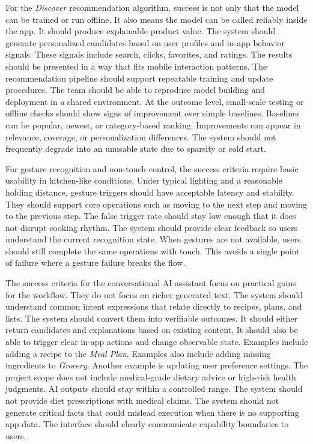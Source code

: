 \documentclass[journal]{IEEEtran}
\begin{document}
For the \textit{Discover} recommendation algorithm, success is not only that the model can be trained or run offline. It also means the model can be called reliably inside the app. It should produce explainable product value. The system should generate personalized candidates based on user profiles and in-app behavior signals. These signals include search, clicks, favorites, and ratings. The results should be presented in a way that fits mobile interaction patterns. The recommendation pipeline should support repeatable training and update procedures. The team should be able to reproduce model building and deployment in a shared environment. At the outcome level, small-scale testing or offline checks should show signs of improvement over simple baselines. Baselines can be popular, newest, or category-based ranking. Improvements can appear in relevance, coverage, or personalization differences. The system should not frequently degrade into an unusable state due to sparsity or cold start.

For gesture recognition and non-touch control, the success criteria require basic usability in kitchen-like conditions. Under typical lighting and a reasonable holding distance, gesture triggers should have acceptable latency and stability. They should support core operations such as moving to the next step and moving to the previous step. The false trigger rate should stay low enough that it does not disrupt cooking rhythm. The system should provide clear feedback so users understand the current recognition state. When gestures are not available, users should still complete the same operations with touch. This avoids a single point of failure where a gesture failure breaks the flow.

The success criteria for the conversational AI assistant focus on practical gains for the workflow. They do not focus on richer generated text. The system should understand common intent expressions that relate directly to recipes, plans, and lists. The system should convert them into verifiable outcomes. It should either return candidates and explanations based on existing content. It should also be able to trigger clear in-app actions and change observable state. Examples include adding a recipe to the \textit{Meal Plan}. Examples also include adding missing ingredients to \textit{Grocery}. Another example is updating user preference settings. The project scope does not include medical-grade dietary advice or high-risk health judgments. AI outputs should stay within a controlled range. The system should not provide diet prescriptions with medical claims. The system should not generate critical facts that could mislead execution when there is no supporting app data. The interface should clearly communicate capability boundaries to users.
\end{document}
